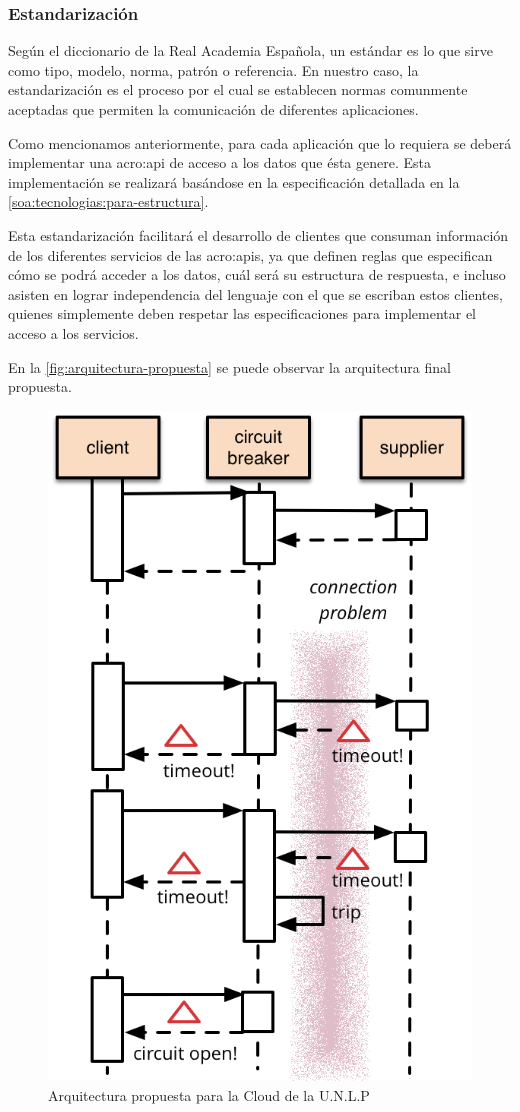 \subsubsection{Estandarización}

Según el diccionario de la Real Academia Española, un estándar es lo que sirve como tipo, modelo, norma, patrón o referencia. En nuestro caso, la estandarización es el proceso por el cual se establecen normas comunmente aceptadas que permiten la comunicación de diferentes aplicaciones.

Como mencionamos anteriormente, para cada aplicación que lo requiera se deberá implementar una \gls{acro:api} de acceso a los datos que ésta genere. Esta implementación se realizará basándose en la especificación  detallada en la \autoref{soa:tecnologias:para-estructura}.

Esta estandarización facilitará el desarrollo de clientes que consuman información de los diferentes servicios de las \glspl{acro:api}, ya que definen reglas que especifican cómo se podrá acceder a los datos, cuál será su estructura de respuesta, e incluso asisten en lograr independencia del lenguaje con el que se escriban estos clientes, quienes simplemente deben respetar las especificaciones para implementar el acceso a los servicios.

En la \autoref{fig:arquitectura-propuesta} se puede observar la arquitectura final propuesta.

\begin{figure}[H]
  \includegraphics[width=\linewidth]{src/images/04-capitulo-4/arquitectura-propuesta.png}
  \caption{Arquitectura propuesta para la Cloud de la U.N.L.P}
  \label{fig:arquitectura-propuesta}
\end{figure}
